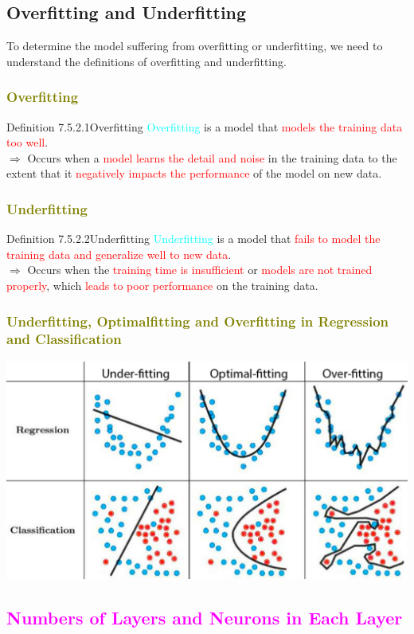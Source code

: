 \documentclass{book}
\begin{document}
\subsection{Overfitting and Underfitting}
To determine the model suffering from overfitting or underfitting, we need to understand the definitions of overfitting and underfitting.
\textcolor{olive}{\subsubsection{Overfitting}}
\begin{defBox}{Definition 7.5.2.1}{Overfitting}
    \textcolor{cyan}{Overfitting} is a model that \textcolor{red}{models the training data too well}.\\
    $\Rightarrow$ Occurs when a \textcolor{red}{model learns the detail and noise} in the training data to the extent that it \textcolor{red}{negatively impacts the performance} of the model on new data.
\end{defBox}
\newpage
\textcolor{olive}{\subsubsection{Underfitting}}
\begin{defBox}{Definition 7.5.2.2}{Underfitting}
    \textcolor{cyan}{Underfitting} is a model that \textcolor{red}{fails to model the training data and generalize well to new data}.\\
    $\Rightarrow$ Occurs when the \textcolor{red}{training time is insufficient} or \textcolor{red}{models are not trained properly}, which \textcolor{red}{leads to poor performance} on the training data.
\end{defBox}
\textcolor{olive}{\subsubsection{Underfitting, Optimalfitting and Overfitting in Regression and Classification}}
\begin{center}
    \includegraphics[scale=0.25]{chapter 7/ch7_figure23.jpeg}
\end{center}
\textcolor{magenta}{\section{\textbf{Numbers of Layers and Neurons in Each Layer}}}
\end{document}
